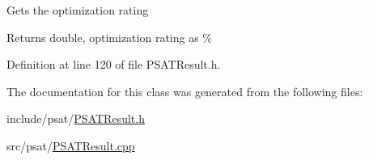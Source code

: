Gets the optimization rating

\begin{DoxyReturn}{Returns}
double, optimization rating as \% 
\end{DoxyReturn}


Definition at line 120 of file P\+S\+A\+T\+Result.\+h.



The documentation for this class was generated from the following files\+:\begin{DoxyCompactItemize}
\item 
include/psat/\hyperlink{_p_s_a_t_result_8h}{P\+S\+A\+T\+Result.\+h}\item 
src/psat/\hyperlink{_p_s_a_t_result_8cpp}{P\+S\+A\+T\+Result.\+cpp}\end{DoxyCompactItemize}

